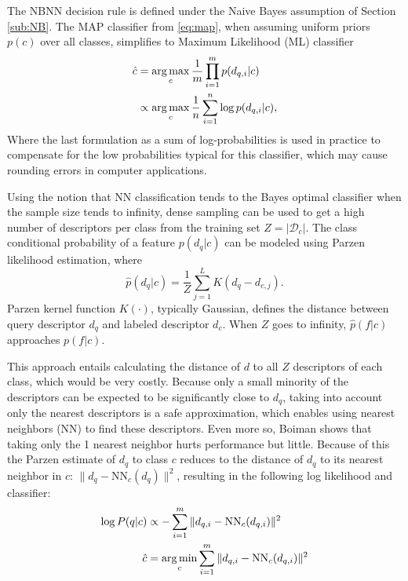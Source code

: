 The NBNN decision rule is defined under the Naive Bayes assumption of Section \ref{sub:NB}. The MAP classifier from \eqref{eq:map}, when assuming uniform priors $p(c)$ over all classes, simplifies to Maximum Likelihood (ML) classifier 
\begin{align}
    \hat c &= \operatorname*{arg\,max}_c \frac{1}{m}\prod_{i=1}^{m} p(d_{q,i}|c)\\
           &\propto \operatorname*{arg\,max}_c \frac{1}{n}\sum_{i=1}^{n} \log p(d_{q,i}|c),
\end{align}
Where the last formulation as a sum of log-probabilities is used in practice to compensate for the low probabilities typical for this classifier, which may cause rounding errors in computer applications.

Using the notion that NN classification tends to the Bayes optimal classifier when the sample size tends to infinity\cite{cover1967nearest, boiman2008defense}, dense sampling can be used to get a high number of descriptors per class from the training set $Z = |\mathcal{D}_c|$. The class conditional probability of a feature $p(d_q|c)$ can be modeled using Parzen likelihood estimation, where
\begin{equation} \label{eq:parzen}
    \hat p(d_q|c) = \frac{1}{Z}\sum_{j=1}^L K(d_q-d_{c,j}).
\end{equation}
Parzen kernel function $K(\cdot)$, typically Gaussian, defines the distance between query descriptor $d_{q}$ and labeled descriptor $d_{c}$. When $Z$ goes to infinity, $\hat p(f|c)$ approaches $p(f|c)$. 

This approach entails calculating the distance of $d$ to all $Z$ descriptors of each class, which would be very costly. Because only a small minority of the descriptors can be expected to be significantly close to $d_q$, taking into account only the nearest descriptors is a safe approximation, which enables using nearest neighbors (NN) to find these descriptors. Even more so, Boiman shows that taking only the 1 nearest neighbor hurts performance but little. Because of this the Parzen estimate of $d_q$ to class $c$ reduces to the distance of $d_q$ to its nearest neighbor in $c$: $\|d_q - \text{NN}_c(d_q)\|^2$, resulting in the following log likelihood and classifier: 
\begin{align}
    \label{eq:nbnnloglikelihood}
    \log P(q|c) &\propto -\sum_{i=1}^m \|d_{q,i} - \text{NN}_c(d_{q,i})\|^2 \\
    \label{eq:nbnnclass}
    \hat c      &= \operatorname*{arg\,min}_c \sum_{i=1}^m \|d_{q,i} - \text{NN}_c(d_{q,i})\|^2
\end{align}

